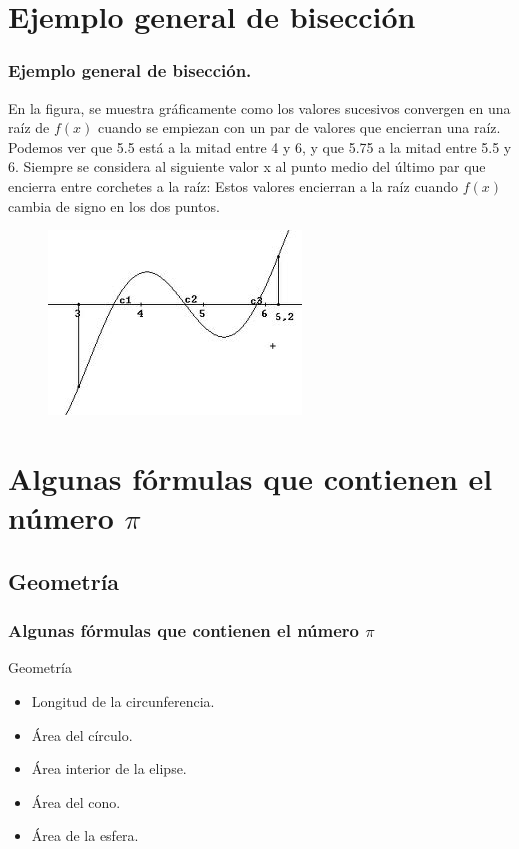 \documentclass{beamer}
\begin{document}
\section{Ejemplo general de bisección}

\begin{frame}
\frametitle{Ejemplo general de bisección.}

\begin{block}{}
En la figura, se muestra gráficamente como los valores sucesivos convergen en una raíz de $f(x)$ cuando se empiezan con un par de valores que encierran una raíz. Podemos ver que 5.5 está a la mitad entre 4 y 6, y que 5.75 a la mitad entre 5.5 y 6. Siempre se considera al siguiente valor x al punto medio del último par que encierra entre corchetes a la raíz: Estos valores encierran a la raíz cuando $f(x)$ cambia de signo en los dos puntos.
\end{block}

\begin{figure}[b]
\begin{center}
\includegraphics[scale=0.4]{images.jpeg}
\end{center}
\end{figure}

\end{frame}

\section{Algunas fórmulas que contienen el número $\pi$}
\subsection{Geometría} 

\begin{frame}
\frametitle{Algunas fórmulas que contienen el número $\pi$} 

\begin{block}{Geometría}

\begin{itemize}

  \item Longitud de la circunferencia.
  \pause
  \item Área del círculo.
  \pause
  \item Área interior de la elipse.
  \pause
  \item Área del cono.
  \pause
  \item Área de la esfera.

\end{itemize}
\end{block}

\end{frame}
\end{document}
